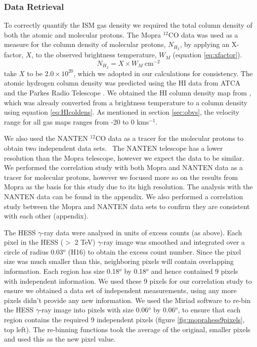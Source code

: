 \documentclass[12pt,a4paper]{article}
\begin{document}
\subsubsection{Data Retrieval}
To correctly quantify the ISM gas density we required the total column density of both the atomic and molecular protons. 
The Mopra $^{12}$CO data was used as a measure for the column density of molecular protons, $N_{H_2}$, by applying an X-factor, $X$, to the observed brightness temperature, $W_M$ (equation \ref{eq:xfactor}). 
\begin{equation}
\label{eq:xfactor}
N_{H_2} = X \times W_M \ \mathrm{ cm}^{-2}
\end{equation} 
\cite{2012ApJ...746...82F} take $X$ to be $2.0 \times 10^{20}$, which we adopted in our calculations for consistency. 
The atomic hydrogen column density was predicted using the HI data from ATCA and the Parkes Radio Telescope \citep{2005ApJS..158..178M}. 
We obtained the HI column density map from \cite{2012ApJ...746...82F}, which was already converted from a brightness temperature to a column density using equation \ref{eq:HIcoldens}. 
As mentioned in section \ref{sec:obvs}, the velocity range for all gas maps ranges from -20 to 0 kms$^{-1}$. 

We also used the NANTEN $^{12}$CO data as a tracer for the molecular protons to obtain two independent data sets. \
The NANTEN telescope has a lower resolution than the Mopra telescope, however we expect the data to be similar. 
We performed the correlation study with both Mopra and NANTEN data as a tracer for molecular protons, however we focused more so on the results from Mopra as the basis for this study due to its high resolution. 
The analysis with the NANTEN data can be found in the appendix. 
We also performed a correlation study between the Mopra and NANTEN data sets to confirm they are consistent with each other (appendix).

The HESS $\gamma$-ray data were analysed in units of excess counts (as above). 
Each pixel in the HESS ($>$ 2 TeV) $\gamma$-ray image was smoothed and integrated over a circle of radius 0.03$^o$ (H16) to obtain the excess count number. 
Since the pixel size was much smaller than this, neighboring pixels will contain overlapping information.
Each region has size 0.18$^o$ by 0.18$^o$ and hence contained 9 pixels with independent information. 
We used these 9 pixels for our correlation study to ensure we obtained a data set of independent measurements, using any more pixels didn't provide any new information. 
We used the Miriad software \citep{1995ASPC...77..433S} to re-bin the HESS $\gamma$-ray image into pixels with size 0.06$^o$ by 0.06$^o$, to ensure that each region contains the required 9 independent pixels (figure \ref{fig:moprahess9pixels}, top left). 
The re-binning functions took the average of the original, smaller pixels and used this as the new pixel value. 
\end{document}
